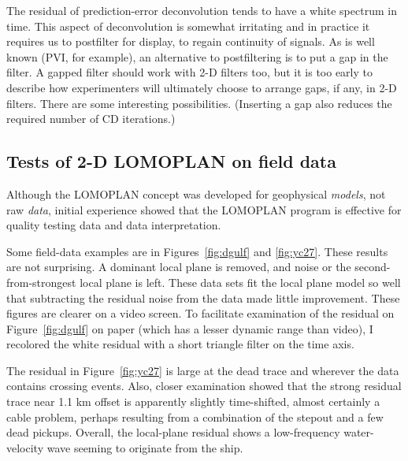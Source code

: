 \par
The residual of prediction-error deconvolution
tends to have a white spectrum in time.
This aspect of deconvolution is somewhat irritating
and in practice it requires us to postfilter for display,
to regain continuity of signals.
As is well known (PVI, for example),
an alternative to postfiltering is to put a gap in the filter.
A gapped filter should work with 2-D filters too,
but it is too early to describe how
experimenters will ultimately choose
to arrange gaps, if any,  in 2-D filters.
There are some interesting possibilities.
(Inserting a gap also reduces the required number of CD iterations.)

\subsection{Tests of 2-D LOMOPLAN on field data}
Although the LOMOPLAN concept was developed for geophysical {\it models},
not raw {\it data},
initial experience showed that the LOMOPLAN program
is effective for quality testing data
and data interpretation.
\par
Some field-data examples are in Figures~\ref{fig:dgulf} and \ref{fig:yc27}.
These results are not surprising.
A dominant local plane is removed,
and noise or the second-from-strongest local plane is left.
These data sets fit the local plane model so well
that subtracting the residual noise from the data made little improvement.
These figures are clearer on a video screen.
To facilitate examination of the residual on Figure~\ref{fig:dgulf} on paper
(which has a lesser dynamic range than video),
I recolored the white residual with a short triangle filter on the time axis.


The residual in Figure~\ref{fig:yc27} is large at the dead trace
and wherever the data contains crossing events.
Also, closer examination showed that the strong residual trace
near 1.1 km offset is apparently slightly time-shifted,
almost certainly a cable problem,
perhaps resulting from a combination of the stepout and a few dead pickups.
Overall, the local-plane residual shows a low-frequency water-velocity wave
seeming to originate from the ship.


